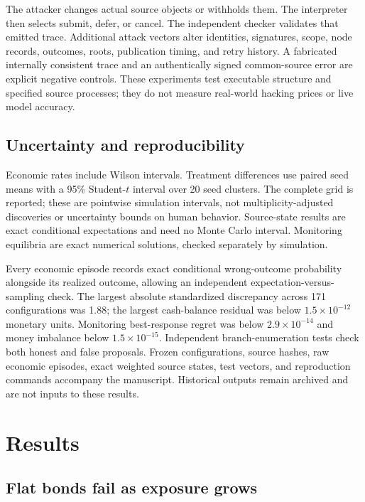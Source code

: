 \documentclass[10pt]{article}
\begin{document}
The attacker changes actual source objects or withholds them. The interpreter then selects submit, defer, or cancel. The independent checker validates that emitted trace. Additional attack vectors alter identities, signatures, scope, node records, outcomes, roots, publication timing, and retry history. A fabricated internally consistent trace and an authentically signed common-source error are explicit negative controls. These experiments test executable structure and specified source processes; they do not measure real-world hacking prices or live model accuracy.

\subsection{Uncertainty and reproducibility}

Economic rates include Wilson intervals. Treatment differences use paired seed means with a 95\% Student-$t$ interval over 20 seed clusters. The complete grid is reported; these are pointwise simulation intervals, not multiplicity-adjusted discoveries or uncertainty bounds on human behavior. Source-state results are exact conditional expectations and need no Monte Carlo interval. Monitoring equilibria are exact numerical solutions, checked separately by simulation.

Every economic episode records exact conditional wrong-outcome probability alongside its realized outcome, allowing an independent expectation-versus-sampling check. The largest absolute standardized discrepancy across 171 configurations was 1.88; the largest cash-balance residual was below $1.5\times10^{-12}$ monetary units. Monitoring best-response regret was below $2.9\times10^{-14}$ and money imbalance below $1.5\times10^{-15}$. Independent branch-enumeration tests check both honest and false proposals. Frozen configurations, source hashes, raw economic episodes, exact weighted source states, test vectors, and reproduction commands accompany the manuscript. Historical outputs remain archived and are not inputs to these results.

\section{Results}
\label{sec:results}

\subsection{Flat bonds fail as exposure grows}
\end{document}
